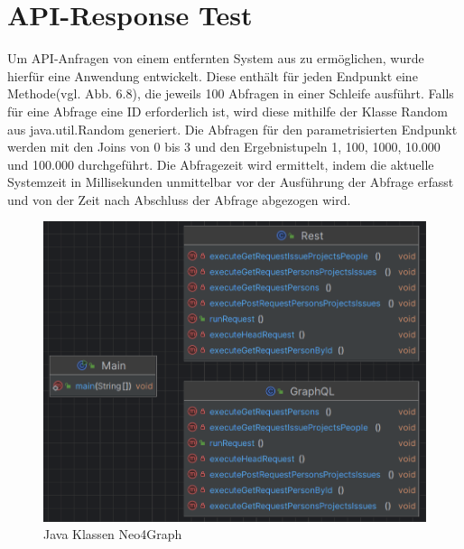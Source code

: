 \section{API-Response Test} %
\label{sec:test}
Um API-Anfragen von einem entfernten System aus zu ermöglichen, wurde hierfür eine Anwendung entwickelt. Diese enthält für jeden Endpunkt eine Methode(vgl. Abb. 6.8), die jeweils 100 Abfragen in einer Schleife ausführt. Falls für eine Abfrage eine ID erforderlich ist, wird diese mithilfe der Klasse Random aus java.util.Random generiert. Die Abfragen für den parametrisierten Endpunkt werden mit den Joins von 0 bis 3 und den Ergebnistupeln 1, 100, 1000, 10.000 und 100.000 durchgeführt. Die Abfragezeit wird ermittelt, indem die aktuelle Systemzeit in Millisekunden unmittelbar vor der Ausführung der Abfrage erfasst und von der Zeit nach Abschluss der Abfrage abgezogen wird.
\begin{figure}[H]
	\centering
	\includegraphics[scale=0.5]{Illustrations/apiresponsetest.png}
	\caption{Java Klassen Neo4Graph}
\end{figure}
